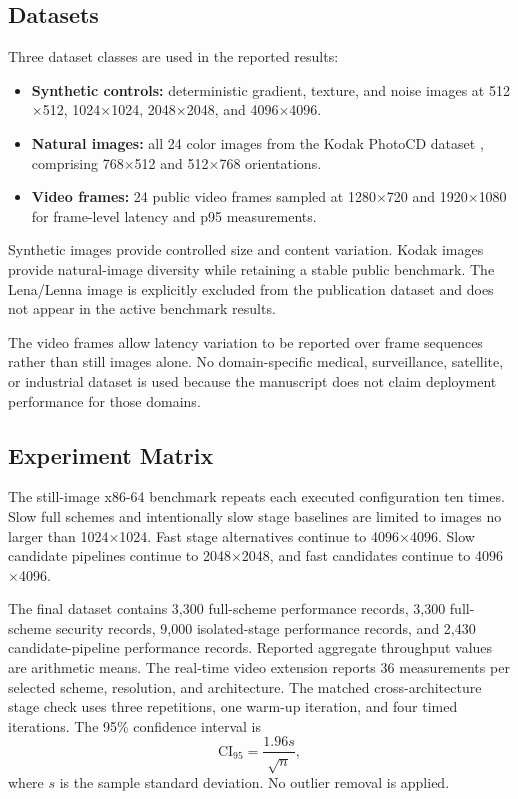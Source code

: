 \documentclass[twocolumn,runningheads]{svjour3}
\begin{document}
\subsection{Datasets}
Three dataset classes are used in the reported results:
\begin{itemize}
\item \textbf{Synthetic controls:} deterministic gradient, texture, and noise
images at 512$\times$512, 1024$\times$1024, 2048$\times$2048, and
4096$\times$4096.
\item \textbf{Natural images:} all 24 color images from the Kodak PhotoCD
dataset \cite{kodak}, comprising 768$\times$512 and 512$\times$768
orientations.
\item \textbf{Video frames:} 24 public video frames sampled at
1280$\times$720 and 1920$\times$1080 for frame-level latency and p95
measurements.
\end{itemize}
Synthetic images provide controlled size and content variation. Kodak images
provide natural-image diversity while retaining a stable public benchmark.
The Lena/Lenna image is explicitly excluded from the publication dataset and
does not appear in the active benchmark results.

The video frames allow latency variation to be reported over frame sequences
rather than still images alone. No domain-specific medical, surveillance,
satellite, or industrial dataset is used because the manuscript does not claim
deployment performance for those domains.

\subsection{Experiment Matrix}
The still-image x86-64 benchmark repeats each executed configuration ten
times. Slow full schemes and intentionally slow stage baselines are limited to
images no larger than 1024$\times$1024. Fast stage alternatives continue to
4096$\times$4096. Slow candidate pipelines continue to 2048$\times$2048, and
fast candidates continue to 4096$\times$4096.

The final dataset contains 3,300 full-scheme performance records, 3,300
full-scheme security records, 9,000 isolated-stage performance records, and
2,430 candidate-pipeline performance records. Reported aggregate throughput
values are arithmetic means. The real-time video extension reports 36
measurements per selected scheme, resolution, and architecture. The matched
cross-architecture stage check uses three repetitions, one warm-up iteration,
and four timed iterations. The 95\% confidence interval is
\begin{equation}
\mathrm{CI}_{95} =
\frac{1.96s}{\sqrt{n}},
\label{eq:ci}
\end{equation}
where $s$ is the sample standard deviation. No outlier removal is applied.
\end{document}
